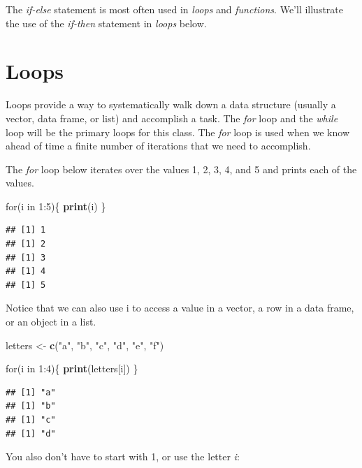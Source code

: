 \documentclass[]{book}
\newenvironment{Shaded}{\begin{snugshade}}{\end{snugshade}}
\newcommand{\KeywordTok}[1]{\textcolor[rgb]{0.13,0.29,0.53}{\textbf{{#1}}}}
\newcommand{\DecValTok}[1]{\textcolor[rgb]{0.00,0.00,0.81}{{#1}}}
\newcommand{\StringTok}[1]{\textcolor[rgb]{0.31,0.60,0.02}{{#1}}}
\newcommand{\NormalTok}[1]{{#1}}
\begin{document}
The \emph{if-else} statement is most often used in \emph{loops} and
\emph{functions}. We'll illustrate the use of the \emph{if-then}
statement in \emph{loops} below.

\section{Loops}\label{loops}

Loops provide a way to systematically walk down a data structure
(usually a vector, data frame, or list) and accomplish a task. The
\emph{for} loop and the \emph{while} loop will be the primary loops for
this class. The \emph{for} loop is used when we know ahead of time a
finite number of iterations that we need to accomplish.

The \emph{for} loop below iterates over the values 1, 2, 3, 4, and 5 and
prints each of the values.

\begin{Shaded}
\begin{Highlighting}[]
\NormalTok{for(i in }\DecValTok{1}\NormalTok{:}\DecValTok{5}\NormalTok{)\{}
  \KeywordTok{print}\NormalTok{(i)}
\NormalTok{\}}
\end{Highlighting}
\end{Shaded}

\begin{verbatim}
## [1] 1
## [1] 2
## [1] 3
## [1] 4
## [1] 5
\end{verbatim}

Notice that we can also use i to access a value in a vector, a row in a
data frame, or an object in a list.

\begin{Shaded}
\begin{Highlighting}[]
\NormalTok{letters <-}\StringTok{ }\KeywordTok{c}\NormalTok{(}\StringTok{"a"}\NormalTok{, }\StringTok{"b"}\NormalTok{, }\StringTok{"c"}\NormalTok{, }\StringTok{"d"}\NormalTok{, }\StringTok{"e"}\NormalTok{, }\StringTok{"f"}\NormalTok{)}

\NormalTok{for(i in }\DecValTok{1}\NormalTok{:}\DecValTok{4}\NormalTok{)\{}
  \KeywordTok{print}\NormalTok{(letters[i])}
\NormalTok{\}}
\end{Highlighting}
\end{Shaded}

\begin{verbatim}
## [1] "a"
## [1] "b"
## [1] "c"
## [1] "d"
\end{verbatim}

You also don't have to start with 1, or use the letter \emph{i}:
\end{document}
